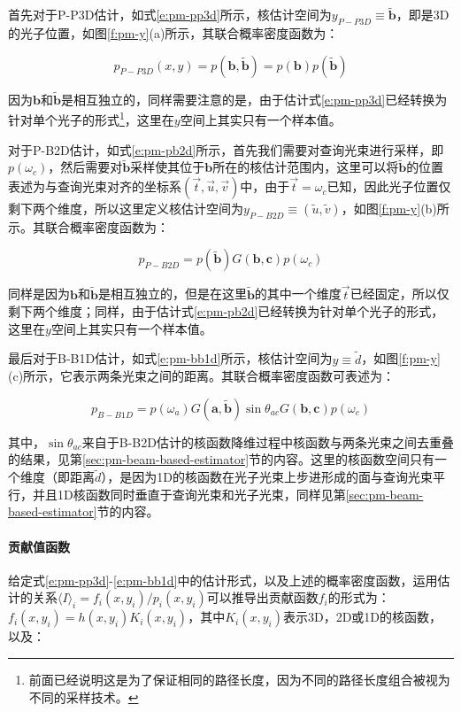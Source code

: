 首先对于P-P3D估计，如式\ref{e:pm-pp3d}所示，核估计空间为$y_{P-P3D}\equiv \tilde{\mathbf{b}}$，即是3D的光子位置，如图\ref{f:pm-y}(a)所示，其联合概率密度函数为：

\begin{equation}
	p_{P-P3D}(x,y)=p(\mathbf{b},\tilde{\mathbf{b}})=p(\mathbf{b})p(\tilde{\mathbf{b}})
\end{equation}

因为$\mathbf{b}$和$\tilde{\mathbf{b}}$是相互独立的，同样需要注意的是，由于估计式\ref{e:pm-pp3d}已经转换为针对单个光子的形式\footnote{前面已经说明这是为了保证相同的路径长度，因为不同的路径长度组合被视为不同的采样技术。}，这里在$y$空间上其实只有一个样本值。

对于P-B2D估计，如式\ref{e:pm-pb2d}所示，首先我们需要对查询光束进行采样，即$p(\omega_c)$，然后需要对$\tilde{\mathbf{b}}$采样使其位于$\mathbf{b}$所在的核估计范围内，这里可以将$\tilde{\mathbf{b}}$的位置表述为与查询光束对齐的坐标系$(\vec{t},\vec{u},\vec{v})$中，由于$\vec{t}=\omega_c$已知，因此光子位置仅剩下两个维度，所以这里定义核估计空间为$y_{P-B2D}\equiv (\tilde{u},\tilde{v})$，如图\ref{f:pm-y}(b)所示。其联合概率密度函数为：

\begin{equation}
	p_{P-B2D}=p(\tilde{\mathbf{b}})G(\mathbf{b},\mathbf{c})p(\omega_c)
\end{equation}

同样是因为$\mathbf{b}$和$\tilde{\mathbf{b}}$是相互独立的，但是在这里$\tilde{\mathbf{b}}$的其中一个维度$\vec{t}$已经固定，所以仅剩下两个维度；同样，由于估计式\ref{e:pm-pb2d}已经转换为针对单个光子的形式，这里在$y$空间上其实只有一个样本值。

最后对于B-B1D估计，如式\ref{e:pm-bb1d}所示，核估计空间为$y\equiv \tilde{d}$，如图\ref{f:pm-y}(c)所示，它表示两条光束之间的距离。其联合概率密度函数可表述为：

\begin{equation}
	p_{B-B1D}=p(\omega_a)G(\mathbf{a},\tilde{\mathbf{b}})\sin \theta_{ac}G(\mathbf{b},\mathbf{c})p(\omega_c)
\end{equation}

其中，$\sin\theta_{ac}$来自于B-B2D估计的核函数降维过程中核函数与两条光束之间去重叠的结果，见第\ref{sec:pm-beam-based-estimator}节的内容。这里的核函数空间只有一个维度（即距离$\tilde{d}$），是因为1D的核函数在光子光束上步进形成的面与查询光束平行，并且1D核函数同时垂直于查询光束和光子光束，同样见第\ref{sec:pm-beam-based-estimator}节的内容。




\paragraph{贡献值函数}
给定式\ref{e:pm-pp3d}-\ref{e:pm-bb1d}中的估计形式，以及上述的概率密度函数，运用估计的关系$\langle I\rangle_i=f_i(x,y_i)/p_i(x,y_i)$可以推导出贡献函数$f_i$的形式为：$f_i(x,y_i)=h(x,y_i)K_i(x,y_i)$，其中$K_i(x,y_i)$表示3D，2D或1D的核函数，以及：

